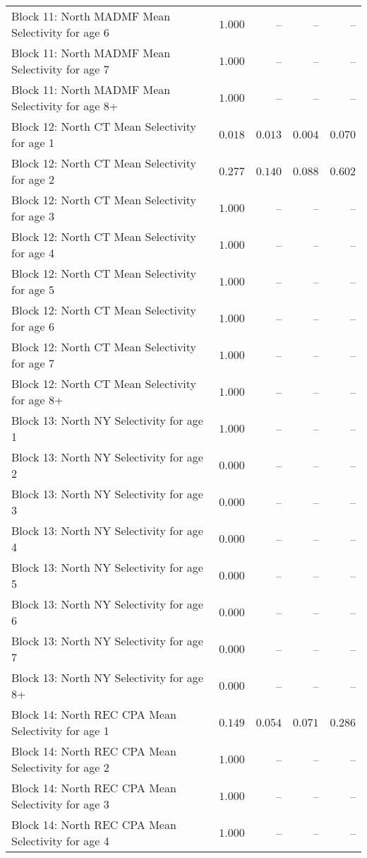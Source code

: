 \documentclass[
]{article}
\begin{document}
\begin{landscape}
\begin{longtable}[t]{lrrrr}
Block 11: North MADMF Mean Selectivity for age 6 & $1.000$ & -- & -- & --\\
Block 11: North MADMF Mean Selectivity for age 7 & $1.000$ & -- & -- & --\\
Block 11: North MADMF Mean Selectivity for age 8+ & $1.000$ & -- & -- & --\\
\addlinespace
Block 12: North CT Mean Selectivity for age 1 & $0.018$ & $0.013$ & $0.004$ & $0.070$\\
Block 12: North CT Mean Selectivity for age 2 & $0.277$ & $0.140$ & $0.088$ & $0.602$\\
Block 12: North CT Mean Selectivity for age 3 & $1.000$ & -- & -- & --\\
Block 12: North CT Mean Selectivity for age 4 & $1.000$ & -- & -- & --\\
Block 12: North CT Mean Selectivity for age 5 & $1.000$ & -- & -- & --\\
\addlinespace
Block 12: North CT Mean Selectivity for age 6 & $1.000$ & -- & -- & --\\
Block 12: North CT Mean Selectivity for age 7 & $1.000$ & -- & -- & --\\
Block 12: North CT Mean Selectivity for age 8+ & $1.000$ & -- & -- & --\\
Block 13: North NY Selectivity for age 1 & $1.000$ & -- & -- & --\\
Block 13: North NY Selectivity for age 2 & $0.000$ & -- & -- & --\\
\addlinespace
Block 13: North NY Selectivity for age 3 & $0.000$ & -- & -- & --\\
Block 13: North NY Selectivity for age 4 & $0.000$ & -- & -- & --\\
Block 13: North NY Selectivity for age 5 & $0.000$ & -- & -- & --\\
Block 13: North NY Selectivity for age 6 & $0.000$ & -- & -- & --\\
Block 13: North NY Selectivity for age 7 & $0.000$ & -- & -- & --\\
\addlinespace
Block 13: North NY Selectivity for age 8+ & $0.000$ & -- & -- & --\\
Block 14: North REC CPA Mean Selectivity for age 1 & $0.149$ & $0.054$ & $0.071$ & $0.286$\\
Block 14: North REC CPA Mean Selectivity for age 2 & $1.000$ & -- & -- & --\\
Block 14: North REC CPA Mean Selectivity for age 3 & $1.000$ & -- & -- & --\\
Block 14: North REC CPA Mean Selectivity for age 4 & $1.000$ & -- & -- & --\\

\end{longtable}
\end{landscape}
\end{document}
